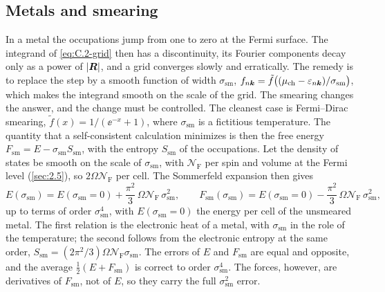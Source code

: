 \subsection{Metals and smearing}

In a metal the occupations jump from one to zero at the Fermi surface. The integrand of \cref{eq:C.2-grid} then has a discontinuity, its Fourier components decay only as a power of $|\bm{R}|$, and a grid converges slowly and erratically. The remedy is to replace the step by a smooth function of width $\sigma_{\mathrm{sm}}$, $f_{n\bm{k}} = \tilde f\bigl((\mu_{\mathrm{ch}} - \varepsilon_{n\bm{k}})/\sigma_{\mathrm{sm}}\bigr)$, which makes the integrand smooth on the scale of the grid. The smearing changes the answer, and the change must be controlled. The cleanest case is Fermi--Dirac smearing, $\tilde f(x) = 1/(\ee^{-x} + 1)$, where $\sigma_{\mathrm{sm}}$ is a fictitious temperature. The quantity that a self-consistent calculation minimizes is then the free energy $F_{\mathrm{sm}} = E - \sigma_{\mathrm{sm}}S_{\mathrm{sm}}$, with the entropy $S_{\mathrm{sm}}$ of the occupations. Let the density of states be smooth on the scale of $\sigma_{\mathrm{sm}}$, with $\mathcal{N}_{\mathrm{F}}$ per spin and volume at the Fermi level (\cref{sec:2.5}), so $2\Omega\mathcal{N}_{\mathrm{F}}$ per cell. The Sommerfeld expansion then gives
\begin{equation}
  E(\sigma_{\mathrm{sm}}) = E(\sigma_{\mathrm{sm}} = 0) + \frac{\pi^2}{3}\,\Omega\mathcal{N}_{\mathrm{F}}\,\sigma_{\mathrm{sm}}^2, \qquad
  F_{\mathrm{sm}}(\sigma_{\mathrm{sm}}) = E(\sigma_{\mathrm{sm}} = 0) - \frac{\pi^2}{3}\,\Omega\mathcal{N}_{\mathrm{F}}\,\sigma_{\mathrm{sm}}^2 ,
  \label{eq:E.1-sommerfeld}
\end{equation}
up to terms of order $\sigma_{\mathrm{sm}}^4$, with $E(\sigma_{\mathrm{sm}} = 0)$ the energy per cell of the unsmeared metal. The first relation is the electronic heat of a metal, with $\sigma_{\mathrm{sm}}$ in the role of the temperature; the second follows from the electronic entropy at the same order, $S_{\mathrm{sm}} = (2\pi^2/3)\Omega\mathcal{N}_{\mathrm{F}}\sigma_{\mathrm{sm}}$. The errors of $E$ and $F_{\mathrm{sm}}$ are equal and opposite, and the average $\tfrac12(E + F_{\mathrm{sm}})$ is correct to order $\sigma_{\mathrm{sm}}^4$. The forces, however, are derivatives of $F_{\mathrm{sm}}$, not of $E$, so they carry the full $\sigma_{\mathrm{sm}}^2$ error.

